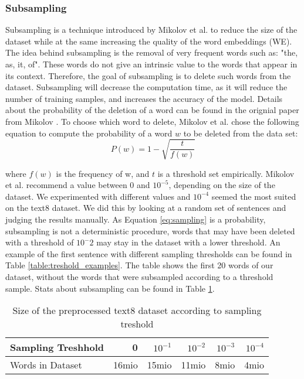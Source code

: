 \subsubsection{Subsampling}
Subsampling is a technique introduced by Mikolov et al. \citep{mikolov} to reduce the size of the dataset while at the same increasing the quality of the word embeddings (WE). The idea behind subsampling is the removal of very frequent words such as: "the, as, it, of". These words do not give an intrinsic value to the words that appear in its context. Therefore, the goal of subsampling is to delete such words from the dataset. Subsampling will decrease the computation time, as it will reduce the number of training samples, and increases the accuracy of the model. Details about the probability of the deletion of a word can be found in the orignial paper from Mikolov \citep{mikolov2}.
\iffalse
To choose which word to delete, Mikolov et al. \citep{mikolov2} chose the following equation to compute the probability of a word $w$  to be deleted from the data set:
\begin{equation} \label{eq:sampling}
P(w) = 1- \sqrt{{\frac{t}{f(w)}}}
\end{equation}

where $f(w)$ is the frequency of w, and $t$ is a threshold set empirically. Mikolov et al. recommend a value between $0$ and $10^{-5}$, depending on the size of the dataset. We experimented with different values and $10^{-4}$ seemed the most suited on the text8 dataset. We did this by looking at a random set of sentences and judging the results manually. 
As Equation \ref{eq:sampling} is a probability, subsampling is not a deterministic procedure, words that may have been deleted with a threshold of $10^-2$ may stay in the dataset with a lower threshold. 
An example of the first sentence with different sampling thresholds can be found in Table \ref{table:treshold_examples}. The table shows the first 20 words of our dataset, without the words that were subsampled according to a threshold sample. Stats about subsampling can be found in Table \ref{table:threshold}.
\begin{table}[tb]
\caption{Size of the preprocessed text8 dataset according to sampling treshold}
    \begin{tabular}{l r r r r r}%
        \toprule
Sampling Treshhold & 0 & $ 10^{-1}$&$ 10^{-2}$& $10^{-3} $ &$10^{-4} $ \\ 
        \midrule%
Words in Dataset  & 16mio & 15mio & 11mio & 8mio & 4mio \\ 
        \bottomrule%
   \end{tabular}%
   \label{table:threshold}%
\end{table}

